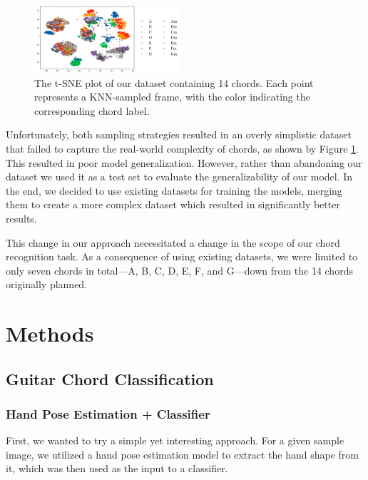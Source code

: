 \documentclass[10pt,twocolumn,letterpaper]{article}
\begin{document}
\begin{figure}[h]
    \centering
    \includegraphics[width=0.48\textwidth]{images/final/Guitar-chords-ours_t-sne_plot.png}
    \caption{The t-SNE plot of our dataset containing 14 chords. Each point represents a KNN-sampled frame, with the color indicating the corresponding chord label.}
    \label{fig:ours-tsne-plot}
\end{figure}

Unfortunately, both sampling strategies resulted in an overly simplistic dataset that failed to capture the real-world complexity of chords, as shown by Figure \ref{fig:ours-tsne-plot}. This resulted in poor model generalization. However, rather than abandoning our dataset we used it as a test set to evaluate the generalizability of our model. In the end, we decided to use existing datasets \cite{guitar-chord-tvon8_dataset,guitar-chord-bounding-box_dataset, guitar-chord-handshape_dataset, guitar-chords-daewp_dataset} for training the models, merging them to create a more complex dataset which resulted in significantly better results.

This change in our approach necessitated a change in the scope of our chord recognition task. As a consequence of using existing datasets, we were limited to only seven chords in total—A, B, C, D, E, F, and G—down from the 14 chords originally planned.

\section{Methods}

\subsection{Guitar Chord Classification}

\subsubsection{Hand Pose Estimation + Classifier}
First, we wanted to try a simple yet interesting approach. For a given sample image, we utilized a hand pose estimation model to extract the hand shape from it, which was then used as the input to a classifier.
\end{document}
